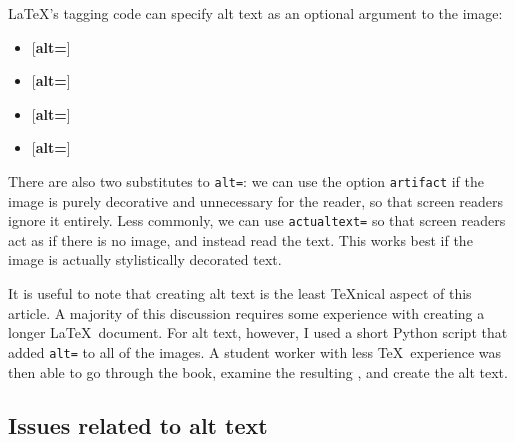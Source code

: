 \documentclass{ltugboat}
\begin{document}
\LaTeX's tagging code can specify alt text as an optional argument
to the image:
\begin{itemize}
\ttfamily
\item{}[\textbf{alt=}]
\item{}[\textbf{alt=}]
\item{}[\textbf{alt=}]
\item{}[\textbf{alt=}]
\end{itemize}
There are also two substitutes to \texttt{alt=}:
we can use the option \texttt{artifact}
if the image is purely decorative and unnecessary for the reader,
so that screen readers ignore it entirely.
Less commonly, we can use \texttt{actualtext=}
so that screen readers act as if there is no image,
and instead read the text.
This works best if the image is actually stylistically decorated text.

It is useful to note that creating alt text is
the least \TeX nical aspect of this article.
A majority of this discussion requires some experience with creating
a longer \LaTeX\ document.
For alt text, however, I used a short Python script that added
\texttt{alt=} to all of the images.
A student worker with less \TeX\ experience was then able to go through
the book, examine the resulting \PDF, and create the alt text.

\subsection{Issues related to alt text}
\end{document}
